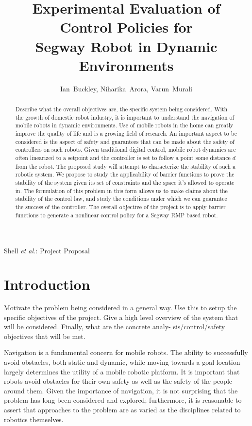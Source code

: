 \documentclass[journal]{IEEEtran}
\begin{document}
%
\title{Experimental Evaluation of Control Policies for \\Segway Robot in Dynamic Environments }
\author{Ian~Buckley, Niharika~Arora, Varun~Murali}
%
{Shell \MakeLowercase{\textit{et al.}}: Project Proposal}
\maketitle

\begin{abstract}
Describe what the overall objectives are, the specific system being
considered.
\fi
With the growth of domestic robot industry, it is important to understand the navigation of mobile robots in dynamic environments. Use of mobile robots in the home can greatly improve the quality of life and is a growing field of research. An important aspect to be considered is the aspect of safety and guarantees that can be made about the safety of controllers on such robots. Given traditional digital control, mobile robot dynamics are often linearized to a setpoint and the controller is set to follow a point some distance \textbf{$d$} from the robot. The proposed study will attempt to characterize the stability of such a robotic system. We propose to study the applicability of barrier functions to prove the stability of the system given its set of constraints and the space it's allowed to operate in. The formulation of this problem in this form allows us to make claims about the stability of the control law, and study the conditions under which we can guarantee the success of the controller. The overall objective of the project is to apply barrier functions to generate a nonlinear control policy for a Segway RMP based robot.
\end{abstract}

\section{Introduction}
Motivate the problem being considered in a general way.  Use
this to setup the specific objectives of the project.  Give a high level overview
of the system that will be considered.  Finally, what are the concrete analy-
sis/control/safety objectives that will be met.
\fi

Navigation is a fundamental concern for mobile robots. The ability to successfully avoid obstacles, both static and dynamic, while moving towards a goal location largely determines the utility of a mobile robotic platform. It is important that robots avoid obstacles for their own safety as well as the safety of the people around them. Given the importance of navigation, it is not surprising that the problem has long been considered and explored; furthermore, it is reasonable to assert that approaches to the problem are as varied as the disciplines related to robotics themselves.  
\end{document}
